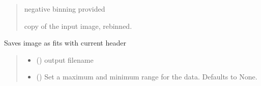 \documentclass[letterpaper,10pt,english]{sphinxmanual}
\begin{document}
\begin{fulllineitems}
\begin{fulllineitems}
\begin{quote}
\begin{description}
\sphinxAtStartPar
{} \textendash{} negative binning provided

\sphinxAtStartPar
copy of the input image, rebinned.

\sphinxAtStartPar
{\hyperref[\detokenize{micropolarray:micropolarray.image.Image}]{}}

\end{description}\end{quote}

\end{fulllineitems}


\begin{fulllineitems}
\label{\detokenize{micropolarray:micropolarray.image.Image.save_as_fits}}
\pysigstartsignatures
{}
\pysigstopsignatures
\sphinxAtStartPar
Saves image as fits with current header
\begin{quote}\begin{description}
\begin{itemize}
\item {} 
\sphinxAtStartPar
{} () \textendash{} output filename

\item {} 
\sphinxAtStartPar
{} (\sphinxstyleliteralemphasis{\sphinxupquote{{[}}}\sphinxstyleliteralemphasis{\sphinxupquote{, }}\sphinxstyleliteralemphasis{\sphinxupquote{{]}}}\sphinxstyleliteralemphasis{\sphinxupquote{, }}) \textendash{} Set a maximum and minimum range for the data. Defaults to None.

\end{itemize}


\end{description}
\end{quote}
\end{fulllineitems}
\end{fulllineitems}
\end{document}

